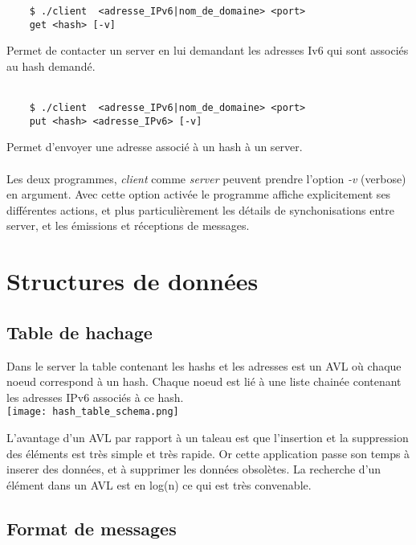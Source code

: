 \documentclass[a4paper,11pt,DIV=12]{scrreprt}
\begin{document}
    \begin{lstlisting}
    $ ./client  <adresse_IPv6|nom_de_domaine> <port>
    get <hash> [-v]
    \end{lstlisting}

    Permet de contacter un server en lui demandant les adresses Iv6 qui sont
    associés au hash demandé.
    \\ \\

    \begin{lstlisting}
    $ ./client  <adresse_IPv6|nom_de_domaine> <port>
    put <hash> <adresse_IPv6> [-v]
    \end{lstlisting}

    Permet d'envoyer une adresse associé à un hash à un server.
    \\ \\

    Les deux programmes, \emph{client} comme \emph{server} peuvent prendre
    l'option \emph{-v} (verbose) en argument. Avec cette option activée le
    programme affiche explicitement ses différentes actions, et plus
    particulièrement les détails de synchonisations entre server, et les
    émissions et réceptions de messages.

    \chapter{Structures de données}

    \section{Table de hachage}

    Dans le server la table contenant les hashs et les adresses est un AVL où
    chaque noeud correspond à un hash. Chaque noeud est lié à une liste
    chainée contenant les adresses IPv6 associés à ce hash.\\
    
    \texttt{[image: hash\_table\_schema.png]}

    L'avantage d'un AVL par rapport à un taleau est que l'insertion et la
    suppression des éléments est très simple et très rapide. Or cette
    application passe son temps à inserer des données, et à supprimer les
    données obsolètes. La recherche d'un élément dans un AVL est en log(n) ce
    qui est très convenable.

    \section{Format de messages}
\end{document}
